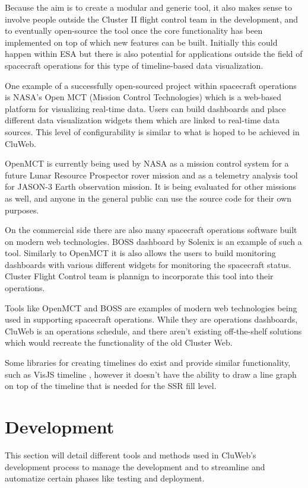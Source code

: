 Because the aim is to create a modular and generic tool, it also makes sense to involve people outside the Cluster II flight control team in the development, and to eventually open-source the tool once the core functionality has been implemented on top of which new features can be built. Initially this could happen within ESA but there is also potential for applications outside the field of spacecraft operations for this type of timeline-based data visualization.

One example of a successfully open-sourced project within spacecraft operations is NASA's Open MCT (Mission Control Technologies) which is a web-based platform for visualizing real-time data. Users can build dashboards and place different data visualization widgets them which are linked to real-time data sources. This level of configurability is similar to what is hoped to be achieved in CluWeb.

OpenMCT is currently being used by NASA as a mission control system for a future Lunar Resource Prospector rover mission and as a telemetry analysis tool for JASON-3 Earth observation mission. It is being evaluated for other missions as well, and anyone in the general public can use the source code for their own purposes.

\cite{trimble2014reconfigurable, trimble2016open}

On the commercial side there are also many spacecraft operations software built on modern web technologies. BOSS dashboard by Solenix is an example of such a tool. Similarly to OpenMCT it is also allows the users to build monitoring dashboards with various different widgets for monitoring the spacecraft status. Cluster Flight Control team is plannign to incorporate this tool into their operations.
\cite{boss}

Tools like OpenMCT and BOSS are examples of modern web technologies being used in supporting spacecraft operations. While they are operations dashboards, CluWeb is an operations schedule, and there aren't existing off-the-shelf solutions which would recreate the functionality of the old Cluster Web. 

Some libraries for creating timelines do exist and provide similar functionality, such as VisJS timeline \cite{visjs}, however it doesn't have the ability to draw a line graph on top of the timeline that is needed for the SSR fill level.

\section{Development}
This section will detail different tools and methods used in CluWeb's development process to manage the development and to streamline and automatize certain phases like testing and deployment.

